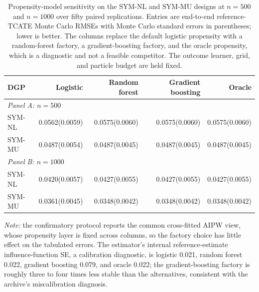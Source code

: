 \begin{table}[!ht]
\centering
\scriptsize
\setlength{\tabcolsep}{3pt}
\caption{Propensity-model sensitivity on the SYM-NL and SYM-MU designs at $n=500$ and $n=1000$ over fifty paired replications. Entries are end-to-end reference-TCATE Monte Carlo RMSEs with Monte Carlo standard errors in parentheses; lower is better. The columns replace the default logistic propensity with a random-forest factory, a gradient-boosting factory, and the oracle propensity, which is a diagnostic and not a feasible competitor. The outcome learner, grid, and particle budget are held fixed.}
\label{tab:sensitivity-propensity}
\begin{tabular}{lrrrr}
\toprule
DGP & Logistic & Random forest & Gradient boosting & Oracle \\
\midrule
\multicolumn{5}{l}{\textit{Panel A: $n=500$}} \\
\midrule
SYM-NL & 0.0562(0.0059) & 0.0575(0.0060) & 0.0575(0.0060) & 0.0575(0.0060) \\
SYM-MU & 0.0487(0.0054) & 0.0487(0.0045) & 0.0487(0.0045) & 0.0487(0.0045) \\
\multicolumn{5}{l}{\textit{Panel B: $n=1000$}} \\
\midrule
SYM-NL & 0.0420(0.0057) & 0.0427(0.0055) & 0.0427(0.0055) & 0.0427(0.0055) \\
SYM-MU & 0.0361(0.0045) & 0.0348(0.0042) & 0.0348(0.0042) & 0.0348(0.0042) \\
\bottomrule
\end{tabular}
\vspace{2pt}
{\footnotesize \textit{Note:} the confirmatory protocol reports the common cross-fitted AIPW view, whose propensity layer is fixed across columns, so the factory choice has little effect on the tabulated errors. The estimator's internal reference-estimate influence-function SE, a calibration diagnostic, is logistic 0.021, random forest 0.022, gradient boosting 0.079, and oracle 0.022; the gradient-boosting factory is roughly three to four times less stable than the alternatives, consistent with the archive's miscalibration diagnosis.}
\end{table}

